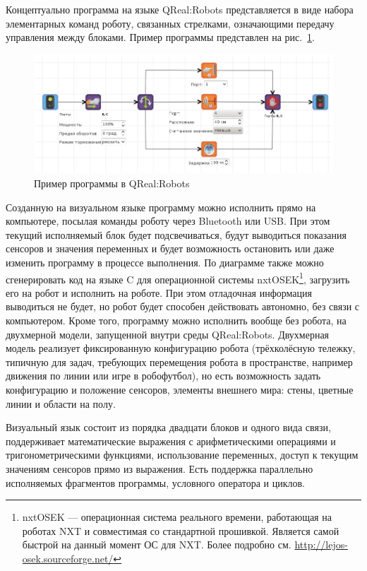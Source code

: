 \documentclass[a4, 12pt]{article}
\begin{document}
Концептуально программа на языке QReal:Robots представляется в виде набора элементарных команд роботу, связанных стрелками, означающими передачу управления между блоками. Пример программы представлен на рис.~\ref{fig2}.

\begin{figure} [ht]
  \begin{center}
    \includegraphics[width=1.0\textwidth]{fig2-qreal-robots.png}
    \caption{Пример программы в QReal:Robots}
    \label{fig2}
  \end{center}
\end{figure}

Созданную на визуальном языке программу можно исполнить прямо на компьютере, посылая команды роботу через Bluetooth или USB. При этом текущий исполняемый блок будет подсвечиваться, будут выводиться показания сенсоров и значения переменных и будет возможность остановить или даже изменить программу в процессе выполнения. По диаграмме также можно сгенерировать код на языке C для операционной системы nxtOSEK\footnote{nxtOSEK --- операционная система реального времени, работающая на роботах NXT и совместимая со стандартной прошивкой. Является самой быстрой на данный момент ОС для NXT. Более подробно см. \url{http://lejos-osek.sourceforge.net/}}, загрузить его на робот и исполнить на роботе. При этом отладочная информация выводиться не будет, но робот будет способен действовать автономно, без связи с компьютером. Кроме того, программу можно исполнить вообще без робота, на двухмерной модели, запущенной внутри среды QReal:Robots. Двухмерная модель реализует фиксированную конфигурацию робота (трёхколёсную тележку, 
типичную для задач, требующих перемещения робота в пространстве, например движения по линии или игре в робофутбол), но есть возможность задать конфигурацию и положение сенсоров, элементы внешнего мира: стены, цветные линии и области на полу. 

Визуальный язык состоит из порядка двадцати блоков и одного вида связи, поддерживает математические выражения с арифметическими операциями и тригонометрическими функциями, использование переменных, доступ к текущим значениям сенсоров прямо из выражения. Есть поддержка параллельно исполняемых фрагментов программы, условного оператора и циклов. 
\end{document}
